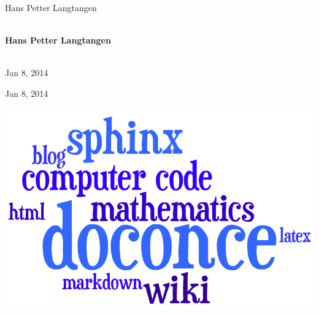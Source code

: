 \documentclass[%
twoside,                 %
draft,                   %
final,                   %
chapterprefix=true,      %
open=right               %
10pt]{book}
\newcounter{doconce:movie:counter}
\newcounter{doconce:exercise:counter}
\begin{document}
\begin{center}
    {\Large\textsf{Hans Petter Langtangen${}^{}$}}\\ [3mm]
    
\ \\ [2mm]


\author{Hans Petter Langtangen}

\author{Hans Petter Langtangen\inst{}}
\institute{}

\begin{center}
{\bf Hans Petter Langtangen${}^{}$} \\ [0mm]
\end{center}

\begin{center}
\end{center}


\date{Jan 8, 2014}
\maketitle
\date{Jan 8, 2014
}

\ \\ [10mm]
{\large\textsf{Jan 8, 2014}}

\end{center}
\vfill
\clearpage

\begin{center}
Jan 8, 2014
\end{center}

\vspace{1cm}



\begin{center}  %
  \centerline{\includegraphics[width=0.5\linewidth]{fig/doconce1b.png}}
\end{center}
\end{document}
